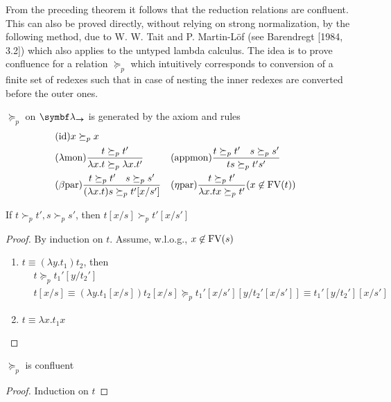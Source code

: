 \documentclass[11pt]{article}
\begin{document}
From the preceding theorem it follows that the reduction relations are
confluent. This can also be proved directly, without relying on strong
normalization, by the following method, due to W. W. Tait and P. Martin-Löf
(see Barendregt [1984, 3.2]) which also applies to the untyped lambda calculus.
The idea is to prove confluence for a relation \(\succeq_p\) which intuitively
corresponds to conversion of a finite set of redexes such that in case of
nesting the 
inner redexes are converted before the outer ones.
\begin{definition}[]
\(\succeq_p\) on \(\blambda_{\bto}\) is generated by the axiom and rules
\begin{alignat*}{2}
&(\text{id})x\succeq_p x\\
&(\lambda\text{mon})\frac{t\succeq_p t'}{\lambda x.t\succeq_p \lambda x.t'}&&
(\text{appmon})\frac{t\succeq_p t'\quad s\succeq_p s'}{ts\succeq_p t's'}\\
&(\beta\text{par})\frac{t\succeq_p t'\quad s\succeq_ps'}{(\lambda x.t)s\succeq_pt'[x/s']}
&&(\eta\text{par})\frac{t\succeq_p t'}{\lambda x.tx\succeq_pt'}
(x\not\in\text{FV}(t))
\end{alignat*}
\end{definition}

\begin{lemma}
If \(t\succ_p t',s\succ_p s'\), then \(t[x/s]\succ_p t'[x/s']\)
\end{lemma}

\begin{proof}
By induction on \(t\). Assume, w.l.o.g., \(x\not\in\text{FV}(s)\)

\begin{enumerate}
\item \(t\equiv(\lambda y.t_1)t_2\), then
\begin{align*}
&t\succeq_p t_1'[y/t_2']\\
&t[x/s]\equiv(\lambda y.t_1[x/s])t_2[x/s]\succeq_p
t_1'[x/s'][y/t_2'[x/s']]\equiv
t_1'[y/t_2'][x/s']
\end{align*}
\item \(t\equiv\lambda x.t_1x\)
\end{enumerate}
\end{proof}

\begin{lemma}[]
\(\succeq_p\) is confluent
\end{lemma}

\begin{proof}
Induction on \(t\)
\end{proof}
\end{document}

